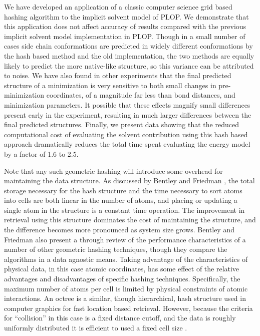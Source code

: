 We have developed an application of a classic computer science grid based hashing algorithm to the implicit solvent model of PLOP.
We demonstrate that this application does not affect accuracy of results compared with the previous implicit solvent model implementation in PLOP.
Though in a small number of cases side chain conformations are predicted in widely different conformations by the hash based method and the old implementation, the two methods are equally likely to predict the more native-like structure, so this variance can be attributed to noise.
We have also found in other experiments that the final predicted structure of a minimization is very sensitive to both small changes in pre-minimization coordinates, of a magnitude far less than bond distances, and minimization parameters.
It possible that these effects magnify small differences present early in the experiment, resulting in much larger differences between the final predicted structures.
Finally, we present data showing that the reduced computational cost of evaluating the solvent contribution using this hash based approach dramatically reduces the total time spent evaluating the energy model by a factor of 1.6 to 2.5.

Note that any such geometric hashing will introduce some overhead for maintaining the data structure.
As discussed by Bentley and Friedman \cite{bentley1979data}, the total storage necessary for the hash structure and the time necessary to sort atoms into cells are both linear in the number of atoms, and placing or updating a single atom in the structure is a constant time operation.
The improvement in retrieval using this structure dominates the cost of maintaining the structure, and the difference becomes more pronounced as system size grows.
Bentley and Friedman also present a through review of the performance characteristics of a number of other geometric hashing techniques, though they compare the algorithms in a data agnostic means.
Taking advantage of the characteristics of physical data, in this case atomic coordinates, has some effect of the relative advantages and disadvantages of specific hashing techniques. 
Specifically, the maximum number of atoms per cell is limited by physical constraints of atomic interactions.
An octree is a similar, though hierarchical, hash structure used in computer graphics for fast location based retrieval.
However, because the criteria for ``collision'' in this case is a fixed distance cutoff, and the data is roughly uniformly distributed it is efficient to used a fixed cell size \cite{turk1989interactive}.

